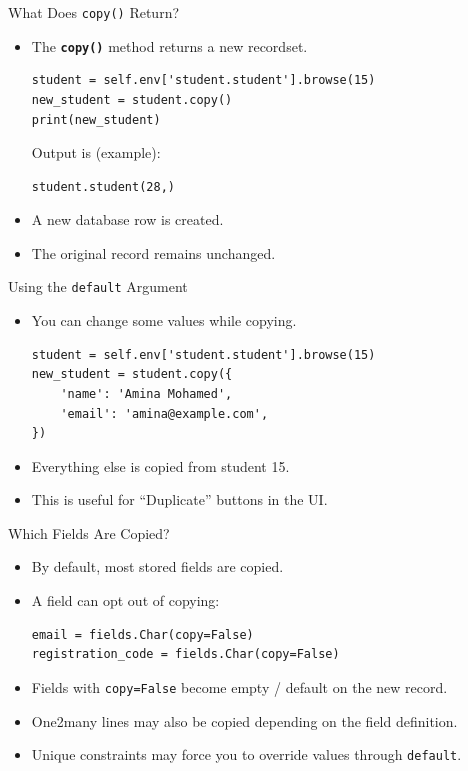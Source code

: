 \begin{frame}[fragile]{What Does \texttt{copy()} Return?}
	\begin{block}{}
		\begin{itemize}
			\item The \textbf{\texttt{copy()}} method returns a new recordset.
\begin{lstlisting}
student = self.env['student.student'].browse(15)
new_student = student.copy()
print(new_student)
\end{lstlisting}
			Output is (example):
\begin{lstlisting}
student.student(28,)
\end{lstlisting}
			\item A new database row is created.
			\item The original record remains unchanged.
		\end{itemize}
	\end{block}
\end{frame}

\begin{frame}[fragile]{Using the \texttt{default} Argument}
	\begin{itemize}
		\item You can change some values while copying.
\begin{lstlisting}
student = self.env['student.student'].browse(15)
new_student = student.copy({
	'name': 'Amina Mohamed',
	'email': 'amina@example.com',
})
\end{lstlisting}
		\item Everything else is copied from student 15.
		\item This is useful for ``Duplicate'' buttons in the UI.
	\end{itemize}
\end{frame}

\begin{frame}[fragile]{Which Fields Are Copied?}
	\begin{itemize}
		\item By default, most stored fields are copied.
		\item A field can opt out of copying:
\begin{lstlisting}
email = fields.Char(copy=False)
registration_code = fields.Char(copy=False)
\end{lstlisting}
		\item Fields with \texttt{copy=False} become empty / default on the new record.
		\item One2many lines may also be copied depending on the field definition.
		\item Unique constraints may force you to override values through \texttt{default}.
	\end{itemize}
\end{frame}


